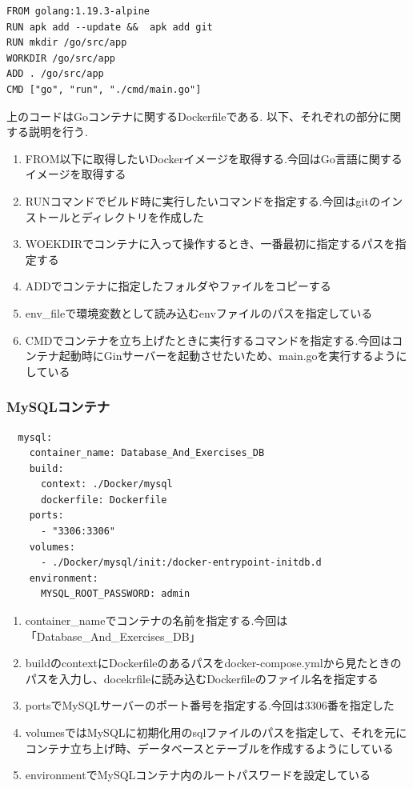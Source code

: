 \documentclass[submit,techrep]{ipsj}
\begin{document}
 \begin{verbatim}
FROM golang:1.19.3-alpine
RUN apk add --update &&  apk add git
RUN mkdir /go/src/app
WORKDIR /go/src/app
ADD . /go/src/app
CMD ["go", "run", "./cmd/main.go"]
 \end{verbatim}
上のコードはGoコンテナに関するDockerfileである.
以下、それぞれの部分に関する説明を行う.
\begin{enumerate}
  \item FROM以下に取得したいDockerイメージを取得する.今回はGo言語に関するイメージを取得する
  \item RUNコマンドでビルド時に実行したいコマンドを指定する.今回はgitのインストールとディレクトリを作成した
  \item  WOEKDIRでコンテナに入って操作するとき、一番最初に指定するパスを指定する
  \item ADDでコンテナに指定したフォルダやファイルをコピーする
  \item  env\_fileで環境変数として読み込むenvファイルのパスを指定している
  \item CMDでコンテナを立ち上げたときに実行するコマンドを指定する.今回はコンテナ起動時にGinサーバーを起動させたいため、main.goを実行するようにしている
 \end{enumerate}


\subsubsection{MySQLコンテナ}
\begin{verbatim}
  mysql:
    container_name: Database_And_Exercises_DB
    build:
      context: ./Docker/mysql
      dockerfile: Dockerfile
    ports:
      - "3306:3306"
    volumes:
      - ./Docker/mysql/init:/docker-entrypoint-initdb.d
    environment:
      MYSQL_ROOT_PASSWORD: admin
\end{verbatim}

\begin{enumerate}
  \item container\_nameでコンテナの名前を指定する.今回は「Database\_And\_Exercises\_DB」
  \item buildのcontextにDockerfileのあるパスをdocker-compose.ymlから見たときのパスを入力し、docekrfileに読み込むDockerfileのファイル名を指定する
   \item  portsでMySQLサーバーのポート番号を指定する.今回は3306番を指定した
  \item volumesではMySQLに初期化用のsqlファイルのパスを指定して、それを元にコンテナ立ち上げ時、データベースとテーブルを作成するようにしている
  \item environmentでMySQLコンテナ内のルートパスワードを設定している
 \end{enumerate}
\end{document}
